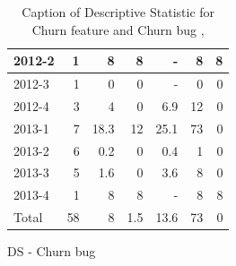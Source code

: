 \documentclass[UKenglish]{ifimaster}  %
\begin{document}
\begin{appendices}
\begin{table}[!htbp]
\begin{adjustwidth}{-2.5cm}{}
\begin{subfigure}[b]{0.3\textwidth}
{\begin{tabular}{ | l | r | r | r | r | r | r | }
 2012-2  & 1 & 8 & 8 & - & 8 & 8 \\ \hline
 2012-3  & 1 & 0 &0 &- & 0 &0\\ \hline
 2012-4  & 3 & 4 & 0 &6.9 & 12 & 0\\ \hline
 2013-1  & 7 & 18.3 & 12 & 25.1 & 73 & 0\\ \hline
 2013-2  & 6 & 0.2 & 0 &0.4 & 1 & 0\\ \hline
 2013-3  & 5 & 1.6 & 0 &3.6 & 8 & 0\\ \hline
 2013-4  & 1 & 8 & 8 & - & 8 & 8 \\ \hline
 Total  & 58 & 8 & 1.5 & 13.6 & 73 & 0\\ \hline
\end{tabular}
}
\caption{DS - Churn bug}
 \label{DS:CB:8}
\end{subfigure}
\end{adjustwidth}
\caption[Optional caption for list of figures]{Caption of Descriptive Statistic for Churn feature and Churn bug  , }
\label{DS:8:4} %
\end{table}




\end{appendices}
\end{document}
